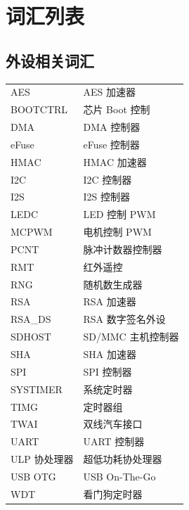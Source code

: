 \section*{词汇列表}\label{glossary}
\rhead{\Navigation}

\subsection*{外设相关词汇}

\begin{longtable}[c]{p{3cm}p{12cm} }

AES & AES 加速器 \\ 
BOOTCTRL & 芯片 Boot 控制 \\ 
DMA & DMA 控制器 \\
eFuse & eFuse 控制器 \\
HMAC & HMAC 加速器 \\ 
I2C & I2C 控制器 \\
I2S & I2S 控制器 \\
LEDC & LED 控制 PWM \\
MCPWM & 电机控制 PWM \\
PCNT & 脉冲计数器控制器 \\
RMT & 红外遥控 \\
RNG & 随机数生成器 \\
RSA & RSA 加速器 \\
RSA\_DS & RSA 数字签名外设 \\
SDHOST & SD/MMC 主机控制器 \\
SHA & SHA 加速器 \\
SPI & SPI 控制器 \\
SYSTIMER & 系统定时器  \\ 
TIMG & 定时器组 \\
TWAI & 双线汽车接口 \\ 
UART & UART 控制器 \\
ULP 协处理器 & 超低功耗协处理器\\
USB OTG & USB On-The-Go \\ 
WDT & 看门狗定时器 \\ 

\end{longtable}








